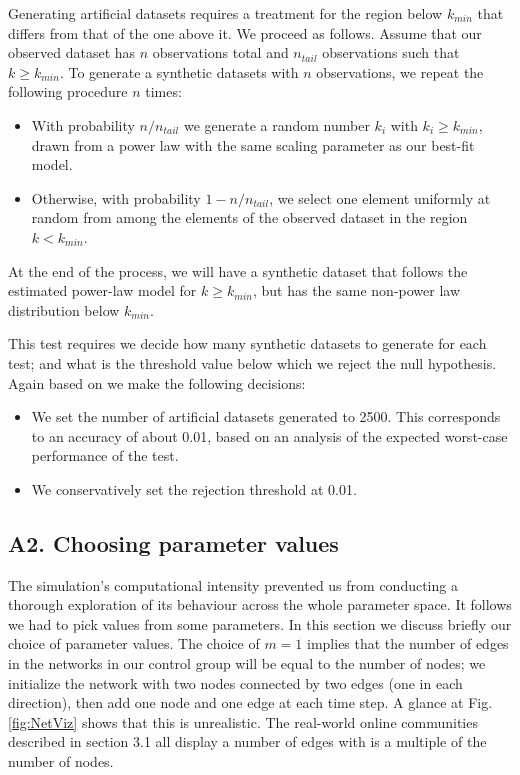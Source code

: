 \documentclass{article}
\begin{document}
Generating artificial datasets requires a treatment for the region below $k_{min}$  that differs from that of the one above it. We proceed as follows. Assume that our observed dataset has $n$ observations total and $n_{tail}$ observations such that $k \geq k_{min}$. To generate a synthetic datasets with $n$ observations, we repeat the following procedure $n$ times:
\begin{itemize}
\item With probability $n/n_{tail}$ we generate a random number $k_i$ with $k_i \geq k_{min}$, drawn from a power law with the same scaling parameter as our best-fit model.
\item Otherwise, with probability $1 - n/n_{tail}$, we select one element uniformly at random from among the elements of the observed dataset in the region $k<k_{min}$.
\end{itemize}

At the end of the process, we will have a synthetic dataset that follows the estimated power-law model for $k \geq k_{min}$, but has the same non-power law distribution below $k_{min}$.

This test requires we decide how many synthetic datasets to generate for each test; and what is the threshold value below which we reject the null hypothesis. Again based on \cite{clauset2009power} we make the following decisions:

\begin{itemize}
\item We set the number of artificial datasets generated to 2500. This corresponds to an accuracy of about 0.01, based on an analysis of the expected worst-case performance of the test. 
\item We conservatively set the rejection threshold at 0.01.
\end{itemize}

\subsection*{A2. Choosing parameter values}

The simulation's computational intensity prevented us from conducting a thorough exploration of its behaviour across the whole parameter space. It follows we had to pick values from some parameters. In this section we discuss briefly our choice of parameter values.
The choice of $m=1$ implies that the number of edges in the networks in our control group will be equal to the number of nodes; we initialize the network with two nodes connected by two edges (one in each direction), then add one node and one edge at each time step. A glance at  Fig.\,\ref{fig:NetViz} shows that this is unrealistic. The real-world online communities described in section 3.1 all display a number of edges with is a multiple of the number of nodes. 
\end{document}
